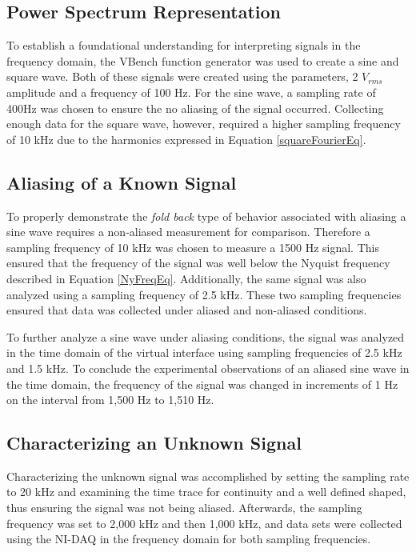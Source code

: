 \documentclass[letterpaper,12pt]{article}
\begin{document}
\subsection{Power Spectrum Representation}
To establish a foundational understanding for interpreting signals in the frequency domain, the VBench function generator was used to create a sine and square wave. Both of these signals were created using the parameters, 2 $V_{rms}$ amplitude and a frequency of 100 Hz. For the sine wave, a sampling rate of 400Hz was chosen to ensure the no aliasing of the signal occurred. Collecting enough data for the square wave, however, required a higher sampling frequency of 10 kHz due to the harmonics expressed in Equation \ref{squareFourierEq}.

\subsection{Aliasing of a Known Signal}
To properly demonstrate the \emph{fold back} type of behavior associated with aliasing a sine wave requires a non-aliased measurement for comparison. Therefore a sampling frequency of 10 kHz was chosen to measure a 1500 Hz signal. This ensured that the frequency of the signal was well below the Nyquist frequency described in Equation \ref{NyFreqEq}. Additionally, the same signal was also analyzed using a sampling frequency of 2.5 kHz. These two sampling frequencies ensured that data was collected under aliased and non-aliased conditions.

To further analyze a sine wave under aliasing conditions, the signal was analyzed in the time domain of the virtual interface using sampling frequencies of 2.5 kHz and 1.5 kHz. To conclude the experimental observations of an aliased sine wave in the time domain, the frequency of the signal was changed in increments of 1 Hz on the interval from 1,500 Hz to 1,510 Hz.

\subsection{Characterizing an Unknown Signal}
Characterizing the unknown signal was accomplished by setting the sampling rate to 20 kHz and examining the time trace for continuity and a well defined shaped, thus ensuring the signal was not being aliased. Afterwards, the sampling frequency was set to 2,000 kHz and then 1,000 kHz, and data sets were collected using the NI-DAQ in the frequency domain for both sampling frequencies.   
\end{document}

